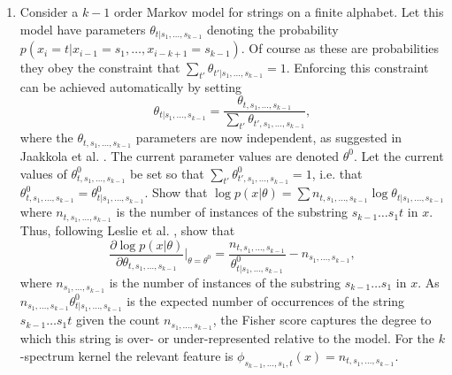 \documentclass[11pt]{book}
\begin{document}
\begin{enumerate}
\item \label{ex:markov_fisher} Consider a $k-1$ order Markov model for strings on a finite alphabet. Let this model have parameters $\theta_{t|s_1,\ldots,s_{k-1}}$ denoting the probability $p(x_i = t|x_{i-1} = s_1, \ldots, x_{i-k+1} = s_{k-1})$. Of course as these are probabilities they obey the constraint that $\sum_{t'} \theta_{t'|s_1,\ldots,s_{k-1}} = 1$. Enforcing this constraint can be achieved automatically by setting
\begin{equation}
\label{eq:markov_normalization}
\theta_{t|s_1,\ldots,s_{k-1}} = \frac{\theta_{t,s_1,\ldots,s_{k-1}}}{\sum_{t'} \theta_{t',s_1,\ldots,s_{k-1}}},
\end{equation}
where the $\theta_{t,s_1,\ldots,s_{k-1}}$ parameters are now independent, as suggested in Jaakkola et al. \cite{jaakkola2000}. The current parameter values are denoted $\theta^0$. Let the current values of $\theta^0_{t,s_1,\ldots,s_{k-1}}$ be set so that $\sum_{t'} \theta^0_{t',s_1,\ldots,s_{k-1}} = 1$, i.e. that $\theta^0_{t,s_1,\ldots,s_{k-1}} = \theta^0_{t|s_1,\ldots,s_{k-1}}$. Show that $\log p(x|\theta) = \sum n_{t,s_1,\ldots,s_{k-1}} \log \theta_{t|s_1,\ldots,s_{k-1}}$ where $n_{t,s_1,\ldots,s_{k-1}}$ is the number of instances of the substring $s_{k-1} \ldots s_1 t$ in $x$. Thus, following Leslie et al. \cite{leslie2003}, show that
\begin{equation}
\label{eq:markov_fisher_score}
\frac{\partial \log p(x|\theta)}{\partial \theta_{t,s_1,\ldots,s_{k-1}}}\bigg|_{\theta=\theta^0} = \frac{n_{t,s_1,\ldots,s_{k-1}}}{\theta^0_{t|s_1,\ldots,s_{k-1}}} - n_{s_1,\ldots,s_{k-1}},
\end{equation}
where $n_{s_1,\ldots,s_{k-1}}$ is the number of instances of the substring $s_{k-1} \ldots s_1$ in $x$. As $n_{s_1,\ldots,s_{k-1}} \theta^0_{t|s_1,\ldots,s_{k-1}}$ is the expected number of occurrences of the string $s_{k-1} \ldots s_1 t$ given the count $n_{s_1,\ldots,s_{k-1}}$, the Fisher score captures the degree to which this string is over- or under-represented relative to the model. For the $k$-spectrum kernel the relevant feature is $\phi_{s_{k-1},\ldots,s_1,t}(x) = n_{t,s_1,\ldots,s_{k-1}}$.
\end{enumerate}
\end{document}
